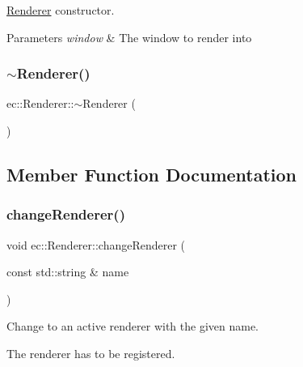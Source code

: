\mbox{\hyperlink{classec_1_1_renderer}{Renderer}} constructor. 


\begin{DoxyParams}{Parameters}
{\em window} & The window to render into \\
\hline
\end{DoxyParams}
\mbox{\label{classec_1_1_renderer_ab0a97bd174127b670899477a576d1fe6}} 
\subsubsection{\texorpdfstring{$\sim$\+Renderer()}{~Renderer()}}
{\footnotesize\ttfamily ec\+::\+Renderer\+::$\sim$\+Renderer (\begin{DoxyParamCaption}{ }\end{DoxyParamCaption})\hspace{0.3cm}{\ttfamily [default]}}



\subsection{Member Function Documentation}
\mbox{\label{classec_1_1_renderer_abb876cb59df2478b52926782e2d0a0a9}} 
\subsubsection{\texorpdfstring{change\+Renderer()}{changeRenderer()}\hspace{0.1cm}{\footnotesize\ttfamily [1/2]}}
{\footnotesize\ttfamily void ec\+::\+Renderer\+::change\+Renderer (\begin{DoxyParamCaption}\item[{const std\+::string \&}]{name }\end{DoxyParamCaption})}



Change to an active renderer with the given name. 

The renderer has to be registered. \mbox{\label{classec_1_1_renderer_aff1e2f129ce6b24a5ed1e27730a13762}} 
